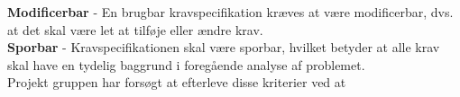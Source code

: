 \noindent \textbf{Modificerbar} - En brugbar kravspecifikation kræves at være modificerbar, dvs. at det skal være let at tilføje eller ændre krav.\\

\noindent \textbf{Sporbar} - Kravspecifikationen skal være sporbar, hvilket betyder at alle krav skal have en tydelig baggrund i foregående analyse af problemet. \\



Projekt gruppen har forsøgt at efterleve disse kriterier ved at 

